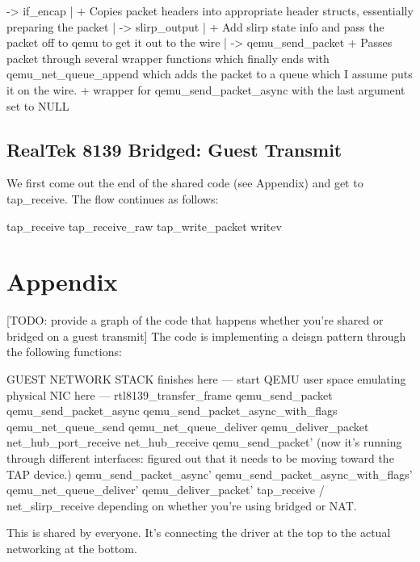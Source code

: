 \documentclass[11pt,pdftex,twocolumn]{article}
\begin{document}
                              -> if_encap
                                  |    + Copies packet headers into appropriate header structs, essentially preparing the packet
                                  |
                                   -> slirp_output
                                       |         + Add slirp state info and pass the packet off to qemu to get it out to the wire
                                       |
                                        -> qemu_send_packet
                                                       + Passes packet through several wrapper functions which finally ends with qemu_net_queue_append which adds the packet to a queue which I assume puts it on the wire.
                                                        + wrapper for qemu_send_packet_async with the last argument set to NULL

\subsection{RealTek 8139 Bridged: Guest Transmit}
We first come out the end of the shared code (see Appendix) and get to tap_receive. The flow continues as follows:

tap_receive
tap_receive_raw
tap_write_packet
writev 


%
%
%
%
%

\section{Appendix}

[TODO: provide a graph of the code that happens whether you're shared or bridged on a guest transmit]
The code is implementing a deisgn pattern through the following functions: 

GUEST NETWORK STACK finishes here
--- start QEMU user space emulating physical NIC here ---
rtl8139_transfer_frame 
qemu_send_packet
qemu_send_packet_async
qemu_send_packet_async_with_flags
qemu_net_queue_send
qemu_net_queue_deliver
qemu_deliver_packet
net_hub_port_receive
net_hub_receive
qemu_send_packet' (now it's running through different interfaces: figured out that it needs to be moving toward the TAP device.)
qemu_send_packet_async'
qemu_send_packet_async_with_flags'
qemu_net_queue_deliver'
qemu_deliver_packet'
tap_receive / net_slirp_receive depending on whether you're using bridged or NAT.

This is shared by everyone. It's connecting the driver at the top to the actual networking at the bottom. 
\end{document}
